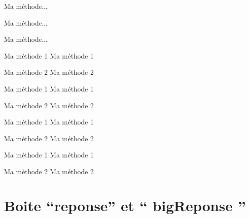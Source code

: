 \documentclass[a4paper,12pt]{article}
\begin{document}
\begin{methode}
	Ma méthode...
\end{methode}%

\begin{code}%
\begin{methode*}
	Ma méthode...
\end{methode*}
\end{code}

\begin{methode*}
	Ma méthode...
\end{methode*}%

\begin{code}%
\begin{methodes}
	\item[Ma méthode 1] Ma méthode 1
	\item[Ma méthode 2] Ma méthode 2
\end{methodes}
\end{code}

\begin{methodes}
	\item[Ma méthode 1] Ma méthode 1
	\item[Ma méthode 2] Ma méthode 2
\end{methodes}%

\begin{code}%
\begin{methodes*}
	\item[Ma méthode 1] Ma méthode 1
	\item[Ma méthode 2] Ma méthode 2
\end{methodes*}
\end{code}

\begin{methodes*}
	\item[Ma méthode 1] Ma méthode 1
	\item[Ma méthode 2] Ma méthode 2
\end{methodes*}%


	\section{Boite ``reponse'' et `` bigReponse ''}
\end{document}
